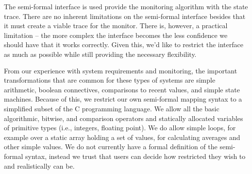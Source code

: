 The semi-formal interface is used provide the monitoring algorithm with the state trace.
There are no inherent limitations on the semi-formal interface besides that it must create a viable trace for the monitor.
There is, however, a practical limitation -- the more complex the interface becomes the less confidence we should have that it works correctly.
Given this, we'd like to restrict the interface as much as possible while still providing the necessary flexibility.

From our experience with system requirements and monitoring, the important transformations that are common for these types of systems are simple arithmetic, boolean connectives, comparisons to recent values, and simple state machines. 
%
Because of this, we restrict our own semi-formal mapping syntax to a simplified subset of the C programming language. We allow all the basic algorithmic, bitwise, and comparison operators and statically allocated variables of primitive types (i.e., integers, floating point).
We do allow simple loops, for example over a static array holding a set of values, for calculating averages and other simple values.
We do not currently have a formal definition of the semi-formal syntax, instead we trust that users can decide how restricted they wish to and realistically can be.

%

